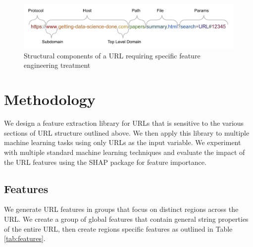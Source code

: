 \documentclass[sigconf]{acmart}
\begin{document}
\begin{figure}
\centering
\includegraphics[scale=0.3]{images/URL_parts.png}
\caption{Structural components of a URL requiring specific feature engineering treatment}
\label{fig:url_structure}
\end{figure}



\section{Methodology}

We design a feature extraction library for URLs that is sensitive to the various sections of URL
structure outlined above. We then apply this library to multiple machine learning tasks using only URLs
as the input variable. We experiment with multiple standard machine learning techniques and evaluate
the impact of the URL features using the SHAP package for feature importance.

\subsection{Features}

We generate URL features in groups that focus on distinct regions across the URL. We create a group
of global features that contain general string properties of the entire URL, then create regions
specific features as outlined in Table \ref{tab:features}.
\end{document}
